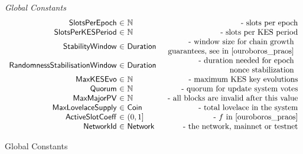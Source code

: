 \begin{figure*}[htb]
  \emph{Global Constants}
  \begin{equation*}
    \begin{array}{r@{~\in~}lr}
      \SlotsPerEpoch & \N & \text{- slots per epoch} \\
      \SlotsPerKESPeriod & \N & \text{- slots per KES period} \\
      \StabilityWindow & \Duration &
      \begin{array}{r}
        \text{- window size for chain growth} \\
        \text{guarantees, see}\text{ in \cite{ouroboros_praos}}
      \end{array} \\
      \RandomnessStabilisationWindow & \Duration &
      \begin{array}{r}
        \text{- duration needed for epoch}\\
        \text{nonce stabilization}\\
      \end{array} \\
      \MaxKESEvo & \N & \text{- maximum KES key evolutions}\\
      \Quorum & \N & \text{- quorum for update system votes}\\
      \MaxMajorPV & \N & \text{- all blocks are invalid after this value}\\
      \MaxLovelaceSupply & \Coin & \text{- total lovelace in the system}\\
      \ActiveSlotCoeff & (0, 1] & \text{ - }f\text{ in \cite{ouroboros_praos}}\\
      \NetworkId & \Network & \text{- the network, mainnet or testnet}\\
    \end{array}
  \end{equation*}
  \caption{Global Constants}
  \label{fig:defs:global-constants}
\end{figure*}

